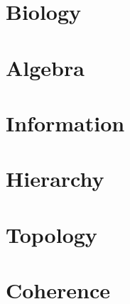 

%

\newtoggle{thmsty}
\togglefalse{thmsty}









	\begin{frame}
		\titlepage
	\end{frame}
	
	\section{Biology}	
	
		
	\section{Algebra}
	

	\section{Information}
	
	
	\section{Hierarchy}
	
	
	\section{Topology}
	
	
	\section{Coherence}
	
	
